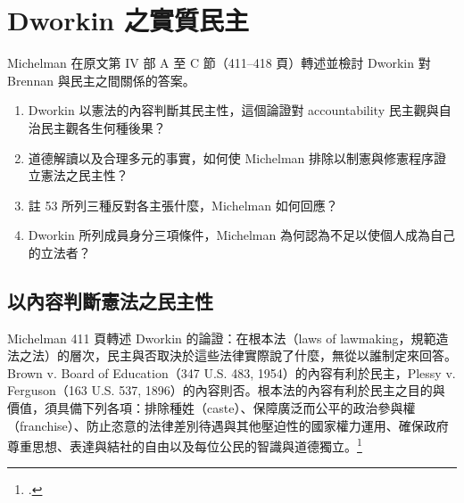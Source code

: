 \chapter{Dworkin 之實質民主}
\label{ch:30_dworkin}

\begin{qaquestion}
Michelman 在原文第 IV 部 A 至 C 節（411--418 頁）轉述並檢討 Dworkin 對 Brennan 與民主之間關係的答案。
\begin{enumerate}
\tightlist
\item Dworkin 以憲法的內容判斷其民主性，這個論證對 accountability 民主觀與自治民主觀各生何種後果？
\item 道德解讀以及合理多元的事實，如何使 Michelman 排除以制憲與修憲程序證立憲法之民主性？
\item 註 53 所列三種反對各主張什麼，Michelman 如何回應？
\item Dworkin 所列成員身分三項條件，Michelman 為何認為不足以使個人成為自己的立法者？
\end{enumerate}
\end{qaquestion}

\section{以內容判斷憲法之民主性}
\label{sec:30_dworkin-1}

Michelman 411 頁轉述 Dworkin 的論證：在根本法（laws of lawmaking，規範造法之法）的層次，民主與否取決於這些法律實際說了什麼，無從以誰制定來回答。Brown v. Board of Education（347 U.S. 483, 1954）的內容有利於民主，Plessy v. Ferguson（163 U.S. 537, 1896）的內容則否。根本法的內容有利於民主之目的與價值，須具備下列各項：排除種姓（caste）、保障廣泛而公平的政治參與權（franchise）、防止恣意的法律差別待遇與其他壓迫性的國家權力運用、確保政府尊重思想、表達與結社的自由以及每位公民的智識與道德獨立。\footcite[411 \& n.39]{michelman1998}

